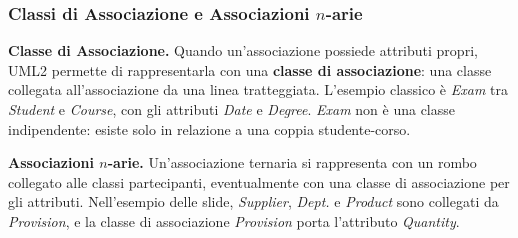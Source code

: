 \documentclass[12pt]{extarticle}
\begin{document}

\subsubsection{Classi di Associazione e Associazioni $n$-arie}

\noindent \textbf{Classe di Associazione.} Quando un'associazione possiede attributi propri, UML2 permette di rappresentarla con una \textbf{classe di associazione}: una classe collegata all'associazione da una linea tratteggiata. L'esempio classico è \textit{Exam} tra \textit{Student} e \textit{Course}, con gli attributi \textit{Date} e \textit{Degree}. \textit{Exam} non è una classe indipendente: esiste solo in relazione a una coppia studente-corso.

\begin{center}
\end{center}


\medskip
\noindent \textbf{Associazioni $n$-arie.} Un'associazione ternaria si rappresenta con un rombo collegato alle classi partecipanti, eventualmente con una classe di associazione per gli attributi. Nell'esempio delle slide, \textit{Supplier}, \textit{Dept.} e \textit{Product} sono collegati da \textit{Provision}, e la classe di associazione \textit{Provision} porta l'attributo \textit{Quantity}.
\end{document}
